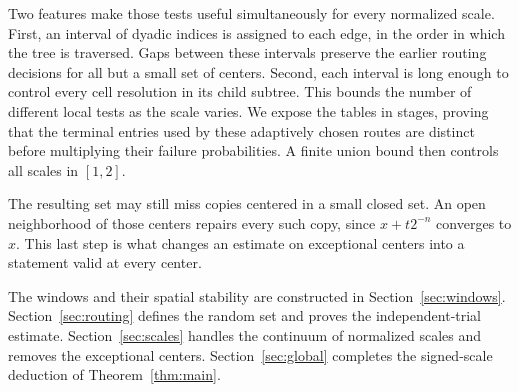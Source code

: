 Two features make those tests useful simultaneously for every normalized
scale. First, an interval of dyadic indices is assigned to each edge, in
the order in which the tree is traversed. Gaps between these intervals
preserve the earlier routing decisions for all but a small set of
centers. Second, each interval is long enough to control every cell
resolution in its child subtree. This bounds the number of different
local tests as the scale varies. We expose the tables in stages, proving
that the terminal entries used by these adaptively chosen routes are
distinct before multiplying their failure probabilities. A finite union
bound then controls all scales in $[1,2]$.

The resulting set may still miss copies centered in a small closed set.
An open neighborhood of those centers repairs every such copy, since
$x+t2^{-n}$ converges to $x$. This last step is what changes an estimate
on exceptional centers into a statement valid at every center.

The windows and their spatial stability are constructed in
Section~\ref{sec:windows}. Section~\ref{sec:routing} defines the random
set and proves the independent-trial estimate.
Section~\ref{sec:scales} handles the continuum of normalized scales and
removes the exceptional centers. Section~\ref{sec:global} completes the
signed-scale deduction of Theorem~\ref{thm:main}.
